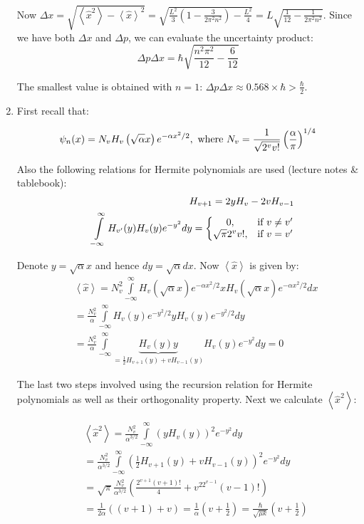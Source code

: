 \begin{enumerate}
Now $\Delta x = \sqrt{\left<\hat{x}^2\right> - \left<\hat{x}\right>^2} = \sqrt{\frac{L^2}{3}\left(1 - \frac{3}{2\pi^2n^2}\right) - \frac{L^2}{4}} = L\sqrt{\frac{1}{12} - \frac{1}{2\pi^2n^2}}$. Since we have both $\Delta x$ and $\Delta p$, we can evaluate the uncertainty product:
$$\Delta p\Delta x = \hbar\sqrt{\frac{n^2\pi^2}{12} - \frac{6}{12}}$$

The smallest value is obtained with $n = 1$: $\Delta p\Delta x\approx 0.568\times\hbar > \frac{\hbar}{2}$.

\item First recall that:

$$\psi_n(x) = N_vH_v\left(\sqrt{\alpha}x\right)e^{-\alpha x^2/2},\textnormal{ where }N_v=\frac{1}{\sqrt{2^vv!}}\left(\frac{\alpha}{\pi}\right)^{1/4}$$

Also the following relations for Hermite polynomials are used (lecture notes \& tablebook):
\begin{eqnarray}
\nonumber
 & & H_{v+1} = 2yH_v - 2vH_{v-1}\\
\nonumber
 & & \int\limits_{-\infty}^{\infty}H_{v'}(y)H_v(y)e^{-y^2}dy = \left\lbrace\begin{matrix}0, & \textnormal{if }v\ne v'\\
\sqrt{\pi}2^vv!, & \textnormal{if }v = v'\end{matrix}\right.
\end{eqnarray}

Denote $y = \sqrt{\alpha}x$ and hence $dy = \sqrt{\alpha}dx$. Now $\left<\hat{x}\right>$ is given by:
\begin{eqnarray}
\nonumber
& & \left<\hat{x}\right> = N_v^2\int\limits_{-\infty}^{\infty}H_v\left(\sqrt{\alpha}x\right)e^{-\alpha x^2/2}xH_v\left(\sqrt{\alpha}x\right)e^{-\alpha x^2/2}dx\\
\nonumber
& & = \frac{N_v^2}{\alpha}\int\limits_{-\infty}^{\infty}H_v(y)e^{-y^2/2}yH_v(y)e^{-y^2/2}dy\\
\nonumber
& & = \frac{N_v^2}{\alpha}\int\limits_{-\infty}^{\infty}\underbrace{H_v(y)y}_{=\frac{1}{2}H_{v+1}(y) + vH_{v-1}(y)}H_v(y)e^{-y^2}dy = 0
\end{eqnarray}

The last two steps involved using the recursion relation for Hermite polynomials as well as their orthogonality property. Next we calculate $\left<\hat{x}^2\right>$:

\begin{eqnarray}
\nonumber
& & \left<\hat{x}^2\right> = \frac{N_v^2}{\alpha^{3/2}}\int\limits_{-\infty}^{\infty}\left(yH_v(y)\right)^2e^{-y^2}dy\\
\nonumber
& & = \frac{N_v^2}{\alpha^{3/2}}\int\limits_{-\infty}^{\infty}\left(\frac{1}{2}H_{v+1}(y) + vH_{v-1}(y)\right)^2e^{-y^2}dy\\
\nonumber
& & = \sqrt{\pi}\frac{N_v^2}{\alpha^{3/2}}\left(\frac{2^{v+1}(v+1)!}{4} + v^22^{v-1}(v - 1)!\right)\\
\nonumber
& & = \frac{1}{2\alpha}\left((v + 1) + v\right) = \frac{1}{\alpha}\left(v + \frac{1}{2}\right) = \frac{\hbar}{\sqrt{\mu k}}\left(v + \frac{1}{2}\right)
\end{eqnarray}


\end{enumerate}
